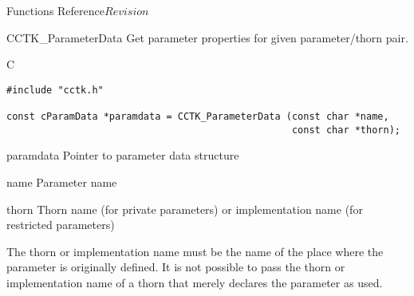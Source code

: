 \begin{cactuspart}{ Functions Reference}{}{$Revision$}
\begin{FunctionDescription}{CCTK\_ParameterData}
\label{CCTK-ParameterData}
Get parameter properties for given parameter/thorn pair.

\begin{SynopsisSection}
\begin{Synopsis}{C}
\begin{verbatim}
#include "cctk.h"

const cParamData *paramdata = CCTK_ParameterData (const char *name,
                                                  const char *thorn);
\end{verbatim}
\end{Synopsis}
\end{SynopsisSection}

\begin{ResultSection}
\begin{Result}{paramdata}
Pointer to parameter data structure
\end{Result}
\end{ResultSection}

\begin{ParameterSection}
\begin{Parameter}{name}
Parameter name
\end{Parameter}
\begin{Parameter}{thorn}
Thorn name (for private parameters) or implementation name (for
restricted parameters)
\end{Parameter}
\end{ParameterSection}

\begin{Discussion}
The thorn or implementation name must be the name of the place where
the parameter is originally defined.  It is not possible to pass the
thorn or implementation name of a thorn that merely declares the
parameter as used.
\end{Discussion}


\end{FunctionDescription}
\end{cactuspart}
